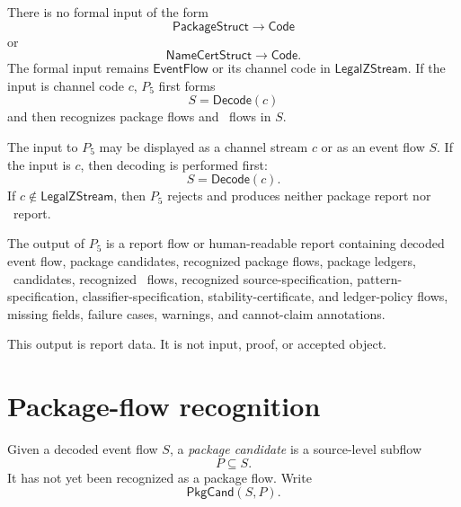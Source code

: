 \begin{principle}
\label{prin:pkg-namecert-no-package-object-input}
There is no formal input of the form
$$
  \mathsf{PackageStruct}\to\mathsf{Code}
$$
or
$$
  \mathsf{NameCertStruct}\to\mathsf{Code}.
$$
The formal input remains $\mathsf{EventFlow}$ or its channel code in $\mathsf{LegalZStream}$. If the input is channel code $c$, $P_5$ first forms
$$
  S=\mathsf{Decode}(c)
$$
and then recognizes package flows and \NameCert\ flows in $S$.
\end{principle}

\begin{definition}[$P_5$ input]
\label{def:pkg-namecert-p5-input}
The input to $P_5$ may be displayed as a channel stream $c$ or as an event flow $S$. If the input is $c$, then decoding is performed first:
$$
  S=\mathsf{Decode}(c).
$$
If $c\notin\mathsf{LegalZStream}$, then $P_5$ rejects and produces neither package report nor \NameCert\ report.
\end{definition}

\begin{definition}[$P_5$ output]
\label{def:pkg-namecert-p5-output}
The output of $P_5$ is a report flow or human-readable report containing decoded event flow, package candidates, recognized package flows, package ledgers, \NameCert\ candidates, recognized \NameCert\ flows, recognized source-specification, pattern-specification, classifier-specification, stability-certificate, and ledger-policy flows, missing fields, failure cases, warnings, and cannot-claim annotations.

This output is report data. It is not input, proof, or accepted object.
\end{definition}

\section{Package-flow recognition}
\label{sec:pkg-namecert-package-recognition}

\begin{definition}
\label{def:pkg-namecert-package-candidate}
Given a decoded event flow $S$, a \emph{package candidate} is a source-level subflow
$$
  P\subseteq S.
$$
It has not yet been recognized as a package flow. Write
$$
  \mathsf{PkgCand}(S,P).
$$
\end{definition}

